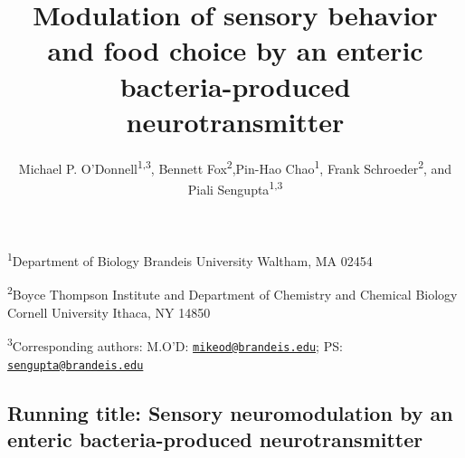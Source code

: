 \documentclass[]{article}
\title{Modulation of sensory behavior and food choice by an enteric
bacteria-produced neurotransmitter}
\author{Michael P. O'Donnell\textsuperscript{1,3}, Bennett
Fox\textsuperscript{2},Pin-Hao Chao\textsuperscript{1}, Frank
Schroeder\textsuperscript{2}, and Piali Sengupta\textsuperscript{1,3}}
\date{}
\begin{document}
\maketitle

\begin{center}

\textsuperscript{1}Department of Biology Brandeis University Waltham, MA
02454

\textsuperscript{2}Boyce Thompson Institute and Department of Chemistry
and Chemical Biology Cornell University Ithaca, NY 14850

\textsuperscript{3}Corresponding authors: M.O'D:
\href{mailto:mikeod@brandeis.edu}{\nolinkurl{mikeod@brandeis.edu}}; PS:
\href{mailto:sengupta@brandeis.edu}{\nolinkurl{sengupta@brandeis.edu}}

\hypertarget{running-title-sensory-neuromodulation-by-an-enteric-bacteria-produced-neurotransmitter}{%
\subsection{Running title: Sensory neuromodulation by an enteric
bacteria-produced
neurotransmitter}\label{running-title-sensory-neuromodulation-by-an-enteric-bacteria-produced-neurotransmitter}}

\end{center}
\end{document}
